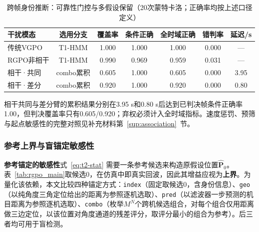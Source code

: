 \documentclass[UTF8,a4paper,zihao=-4]{ctexart}
\begin{document}
\begin{table}[htbp]
\centering
\caption{跨帧身份推断：可靠性门控与多假设保留（20次蒙特卡洛；正确率均按上述口径定义）}\label{tab:assoc}
\small
\begin{tabular}{@{}lcccccc@{}}
\toprule
干扰模态 & 选用分支 & 覆盖率 & 条件正确 & 全时域正确 & 错判率 & 延迟/s\\
\midrule
传统VGPO & T1-HMM & 1.000 & 1.000 & 1.000 & 0.000 & —\\
RGPO非相干 & T1-HMM & 0.990 & 0.969 & 0.959 & 0.031 & —\\
相干·共同 & combo累积 & 0.605 & 1.000 & 0.605 & 0.000 & 3.95\\
相干·差分 & combo累积 & 0.920 & 1.000 & 0.920 & 0.000 & 0.80\\
\bottomrule
\end{tabular}
\end{table}

相干共同与差分臂的累积结果分别在3.95 s和0.80 s后达到已判决帧条件正确率1.00，但判决覆盖率只有0.605/0.920；弃权必须计入全时域指标。速度惩罚、预筛与起点敏感性的完整对照见补充材料第~\ref{sup:association}~节。


\subsubsection{参考上界与盲锚定敏感性}\label{sec:anchor-results}
\noindent\textbf{参考锚定的敏感性}\quad 式~\eqref{eq:t2-stat} 需要一条参考候选来构造原假设位置\(\hat{\boldsymbol P}_0\)。表~\ref{tab:rgpo_main}取候选0，在仿真中即真实回波，因此其增益应视为\textbf{上界}。为量化该依赖，本文比较四种锚定方式：\texttt{index}（固定取候选0，含身份信息）、\texttt{geo}（以纯角度三角定位给出的距离为参照逐机选取）、\texttt{pred}（以滤波器一步预测的机目距离为参照逐机选取）、\texttt{combo}（枚举\(M^N\)个跨机候选组合，对每个组合仅用距离做三边定位，以该位置对角度通道的残差评分，取评分最小的组合为参考）。后三者均可用于盲检测。
\end{document}
